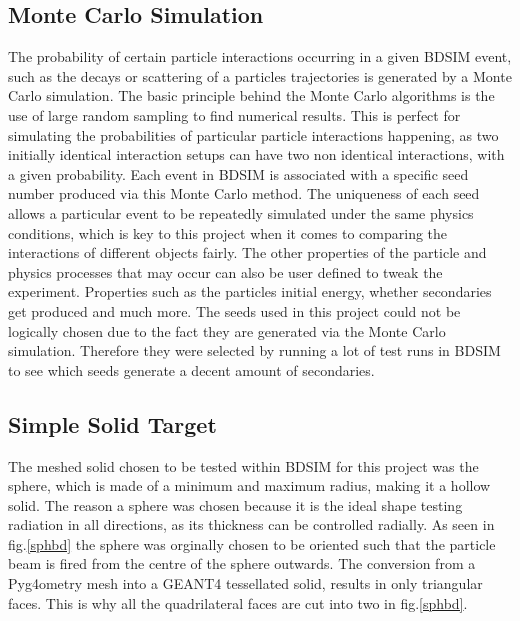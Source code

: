 \documentclass[12pt,a4paper]{article}
\begin{document}
\subsection{Monte Carlo Simulation}
\label{monte}
\noindent The probability of certain particle interactions occurring in a given BDSIM event, such as the decays or scattering of a particles trajectories is generated by a Monte Carlo simulation. The basic principle behind the Monte Carlo algorithms is the use of large random sampling to find numerical results. This is perfect for simulating the probabilities of particular particle interactions happening, as two initially identical interaction setups can have two non identical interactions, with a given probability. Each event in BDSIM is associated with a specific seed number produced via this Monte Carlo method. The uniqueness of each seed allows a particular event to be repeatedly simulated under the same physics conditions, which is key to this project when it comes to comparing the interactions of different objects fairly. The other properties of the particle and physics processes that may occur can also be user defined to tweak the experiment. Properties such as the particles initial energy, whether secondaries get produced and much more. The seeds used in this project could not be logically chosen due to the fact they are generated via the Monte Carlo simulation. Therefore they were selected by running a lot of test runs in BDSIM to see which seeds generate a decent amount of secondaries.

\newpage
\subsection{Simple Solid Target}
The meshed solid chosen to be tested within BDSIM for this project was the sphere, which is made of a minimum and maximum radius, making it a hollow solid. The reason a sphere was chosen because it is the ideal shape testing radiation in all directions, as its thickness can be controlled radially. As seen in fig.\ref{sphbd} the sphere was orginally chosen to be oriented such that the particle beam is fired from the centre of the sphere outwards. The conversion from a Pyg4ometry mesh into a GEANT4 tessellated solid, results in only triangular faces. This is why all the quadrilateral faces are cut into two in fig.\ref{sphbd}.
\end{document}
